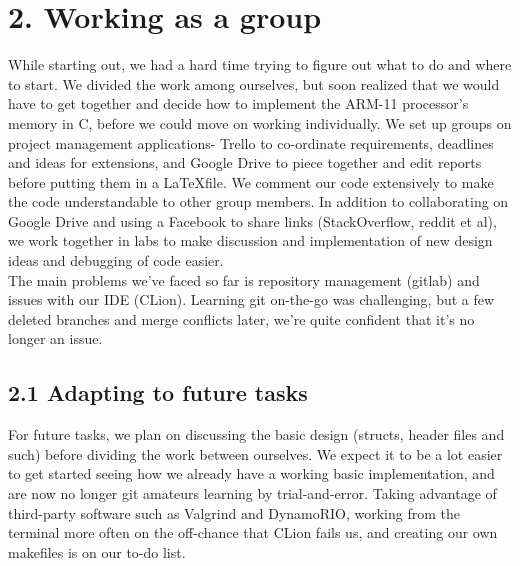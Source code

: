 \documentclass[a4paper, twoside]{report}
\begin{document}
\section*{2. Working as a group}
While starting out, we had a hard time trying to figure out what to do and where to start. We divided the work among ourselves, but soon realized that we would have to get together and decide how to implement the ARM-11 processor's memory in C, before we could move on working individually. 
We set up groups on project management applications- Trello to co-ordinate requirements, deadlines and ideas for extensions, and Google Drive to piece together and edit reports before putting them in a \LaTeX file. We comment our code extensively to make the code understandable to other group members. In addition to collaborating on Google Drive and using a Facebook to share links (StackOverflow, reddit et al), we work together in labs to make discussion and implementation of new design ideas and debugging of code easier. \\
The main problems we've faced so far is repository management (gitlab) and issues with our IDE (CLion). Learning git on-the-go was challenging, but a few deleted branches and merge conflicts later, we're quite confident that it's no longer an issue.

\subsection*{2.1 Adapting to future tasks}

For future tasks, we plan on discussing the basic design (structs, header files and such) before dividing the work between ourselves. We expect it to be a lot easier to get started seeing how we already have a working basic implementation, and are now no longer git amateurs learning by trial-and-error. Taking advantage of third-party software such as Valgrind and DynamoRIO, working from the terminal more often on the off-chance that CLion fails us, and creating our own makefiles is on our to-do list. 
\section*{}
\end{document}
